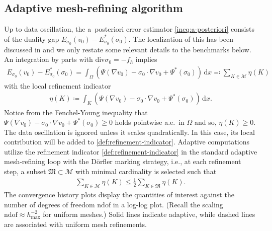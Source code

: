 \documentclass[a4paper]{amsart}
\numberwithin{equation}{section}
\renewcommand{\d}[1]{\,\mathrm{d}#1}
\renewcommand{\div}{\mathrm{div}}
\newcommand{\Mcal}{\mathcal{M}}
\theoremstyle{remark}
\begin{document}
\subsection{Adaptive mesh-refining algorithm}
Up to data oscillation, the a~posteriori error estimator \eqref{ineq:a-posteriori} consists of the duality gap 
$E_{\sigma_0}(v_0) - E_{\sigma_0}^*(\sigma_0)$.
The localization of this has been discussed in \cite{BartelsKaltenbach2023} and we only restate some relevant details to the benchmarks below.
An integration by parts with $\div \sigma_0 = - f_h$ implies
\begin{align*}
	E_{\sigma_0}(v_0) - E^*_{\sigma_0}(\sigma_0) = \int_\Omega (\Psi(\nabla v_0) - \sigma_0 \cdot \nabla v_0 + \Psi^*(\sigma_0)) \d{x} \eqqcolon \sum_{K \in \Mcal} \eta(K)
\end{align*}
with the local refinement indicator
\begin{align}\label{def:refinement-indicator}
	\eta(K) \coloneqq \int_K (\Psi(\nabla v_0) - \sigma_0 \cdot \nabla v_0 + \Psi^*(\sigma_0)) \d{x}.
\end{align}
Notice from the Fenchel-Young inequality that $\Psi(\nabla v_0) - \sigma_0 \cdot \nabla v_0 + \Psi^*(\sigma_0) \geq 0$ holds pointwise a.e.~in $\Omega$ and so, $\eta(K) \geq 0$. 
The data oscillation is ignored unless it scales quadratically. In this case, its local contribution will be added to \eqref{def:refinement-indicator}.
Adaptive computations utilize the refinement indicator \eqref{def:refinement-indicator} in the standard adaptive mesh-refining loop \cite{CarstensenFeischlPagePraetorius2014} with the D\"orfler marking strategy, i.e., at each refinement step, a subset $\mathfrak{M} \subset \mathcal{M}$ with minimal cardinality is selected such that
\begin{align*}
	\sum\nolimits_{K \in \mathcal{M}} \eta(K) \leq \frac{1}{2}\sum\nolimits_{K \in \mathfrak{M}} \eta(K).
\end{align*}
The convergence history plots display the quantities of interest against the number of degrees of freedom $\mathrm{ndof}$ in a log-log plot.
(Recall the scaling $\mathrm{ndof} \approx h^{-2}_\mathrm{max}$ for uniform meshes.)
Solid lines indicate adaptive, while dashed lines are associated with uniform mesh refinements.
\end{document}
